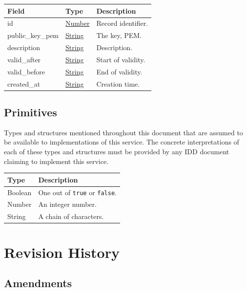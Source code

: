 \documentclass[a4paper]{arrowhead}
\newcommand{\pdef}[1]{{\textcolor{ArrowheadGrey}{#1\label{sec:model:primitives:#1}\label{sec:model:primitives:#1s}\label{sec:model:primitives:#1es}}}}
\newcommand{\pref}[1]{{\textcolor{ArrowheadGrey}{\hyperref[sec:model:primitives:#1]{#1}}}}
\begin{document}
\noindent\begin{tabularx}{\textwidth}{| >{\raggedright\arraybackslash}p{3.9cm} | >{\raggedright\arraybackslash\small}p{5.3cm} | X |} \hline
\rowcolor{gray!33} Field & Type & Description \\ \hline
id & \pref{Number} & Record identifier. \\ \hline
public\_key\_pem & \pref{String} & The key, PEM. \\ \hline
description & \pref{String} & Description. \\ \hline
valid\_after & \pref{String} & Start of validity. \\ \hline
valid\_before & \pref{String} & End of validity. \\ \hline
created\_at & \pref{String} & Creation time. \\ \hline
\end{tabularx}



\subsection{Primitives}
\label{sec:model:primitives}

Types and structures mentioned throughout this document that are assumed to be available to implementations of this service.
The concrete interpretations of each of these types and structures must be provided by any IDD document claiming to implement this service.

\noindent\begin{tabularx}{\textwidth}{| p{4.6cm} | X |} \hline
\rowcolor{gray!33} Type & Description \\ \hline
\pdef{Boolean} & One out of \texttt{true} or \texttt{false}. \\ \hline
\pdef{Number} & An integer number. \\ \hline
\pdef{String} & A chain of characters. \\ \hline
\end{tabularx}

\newpage




\newpage

\section{Revision History}
\subsection{Amendments}
\end{document}
